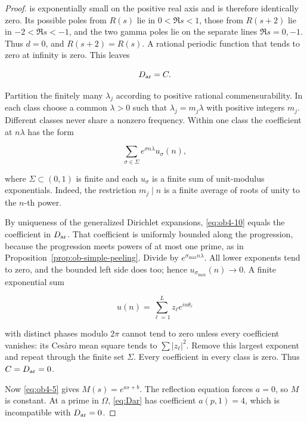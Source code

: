 \begin{proof}
is exponentially small on the positive real axis and is therefore identically zero. Its possible poles from \(R(s)\) lie in \(0<\Re s<1\), those from \(R(s+2)\) lie in \(-2<\Re s<-1\), and the two gamma poles lie on the separate lines \(\Re s=0,-1\). Thus \(d=0\), and \(R(s+2)=R(s)\). A rational periodic function that tends to zero at infinity is zero. This leaves

\begin{equation}\label{eq:ob4-9}
D_{\rm ar}=C.
\end{equation}

Partition the finitely many \(\lambda_j\) according to positive rational commensurability. In each class choose a common \(\lambda>0\) such that \(\lambda_j=m_j\lambda\) with positive integers \(m_j\). Different classes never share a nonzero frequency. Within one class the coefficient at \(n\lambda\) has the form

\begin{equation}\label{eq:ob4-10}
\sum_{\sigma\in\Sigma}
e^{\sigma n\lambda}u_\sigma(n),
\end{equation}

where \(\Sigma\subset(0,1)\) is finite and each \(u_\sigma\) is a finite sum of unit-modulus exponentials. Indeed, the restriction \(m_j\mid n\) is a finite average of roots of unity to the \(n\)-th power.

By uniqueness of the generalized Dirichlet expansions, \eqref{eq:ob4-10} equals the coefficient in \(D_{\rm ar}\). That coefficient is uniformly bounded along the progression, because the progression meets powers of at most one prime, as in Proposition~\ref{prop:ob-simple-peeling}. Divide by \(e^{\sigma_{\max}n\lambda}\). All lower exponents tend to zero, and the bounded left side does too; hence \(u_{\sigma_{\max}}(n)\to0\). A finite exponential sum

\begin{equation}\label{eq:ob4-11}
u(n)=\sum_{\ell=1}^Lz_\ell e^{in\theta_\ell}
\end{equation}

with distinct phases modulo \(2\pi\) cannot tend to zero unless every coefficient vanishes: its Cesàro mean square tends to \(\sum|z_\ell|^2\). Remove this largest exponent and repeat through the finite set \(\Sigma\). Every coefficient in every class is zero. Thus \(C=D_{\rm ar}=0\).

Now \eqref{eq:ob4-5} gives \(M(s)=e^{as+b}\). The reflection equation forces \(a=0\), so \(M\) is constant. At a prime in \(\Omega\), \eqref{eq:Dar} has coefficient \(a(p,1)=4\), which is incompatible with \(D_{\rm ar}=0\). \end{proof}

